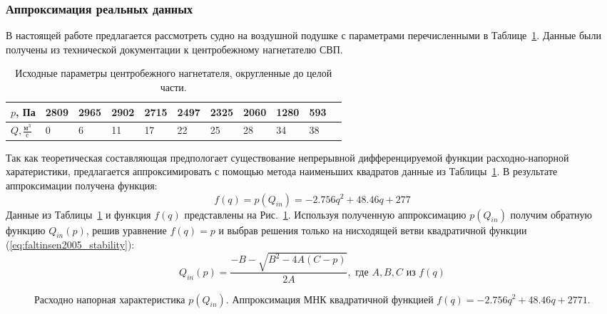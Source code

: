 \begin{centering}
    \subsubsection{Аппроксимация реальных данных}
\end{centering}

В настоящей работе предлагается рассмотреть судно на воздушной подушке с параметрами перечисленными в Таблице~\ref{tab:fan_params}. Данные были получены из технической документации к центробежному нагнетателю СВП.
\begin{table}[H]
    \centering
    \begin{tabular}{@{}l*{10}{l}@{}}
        \toprule
        $p$, Па & 2809 & 2965 & 2902 & 2715 & 2497 & 2325 & 2060 & 1280 & 593 \\
        \midrule
        $Q, \frac{\text{м}^3}{\text{c}}$ & 0 & 6 & 11 & 17 & 22 & 25 & 28 & 34 & 38 \\
        \bottomrule
    \end{tabular}
    \caption{Исходные параметры центробежного нагнетателя, округленные до целой части.}\label{tab:fan_params}
\end{table}
Так как теоретическая составляющая предпологает существование непрерывной дифференцируемой функции расходно-напорной харатеристики, предлагается аппроксимировать с помощью метода наименьших квадратов данные из Таблицы~\ref{tab:fan_params}. В результате аппроксимации получена функция:
\begin{equation}
f(q)=p(Q_{in})=-2.756q^2 + 48.46q + 277
\end{equation}
Данные из Таблицы~\ref{tab:fan_params} и функция $f(q)$ представлены на Рис.~\ref{fig:mnk_approx}. Используя полученную аппроксимацию $p(Q_{in})$ получим обратную функцию $Q_{in}(p)$, решив уравнение $f(q) = p$ и выбрав решения только на нисходящей ветви квадратичной функции (\ref{eq:faltinsen2005_stability}):
\begin{equation}
    Q_{in}(p)=\dfrac{-B-\sqrt{B^2-4A(C-p)}}{2A}, \text{ где } A, B, C \text{ из } f(q)
\end{equation}

\begin{figure}[!hb]
    \centering
    
    \caption{Расходно напорная характеристика $p(Q_{in})$. Аппроксимация МНК квадратичной функцией $f(q)=-2.756q^2 + 48.46q + 2771$.}\label{fig:mnk_approx}
\end{figure}

